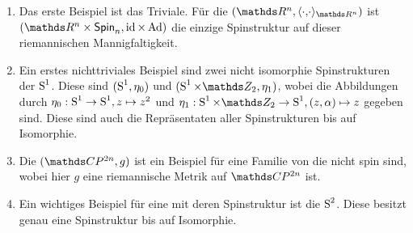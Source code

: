 \begin{Bsp}
	\begin{enumerate}[(1)]
		\item Das erste Beispiel ist das Triviale. Für die \RMF $(\R^n, \scdots_{\R^n})$ ist $(\R^n \times \spin{n},\id \times \Ad)$ 
		die einzige Spinstruktur auf dieser riemannischen 
		Mannigfaltigkeit.
		\item Ein erstes nichttriviales Beispiel sind zwei nicht
		isomorphie Spinstrukturen der $\S^1$. Diese sind $(\S^1 , \eta_0)$ und $(\S^1 \times \Z_2 , \eta_1)$, wobei die Abbildungen durch $\eta_0 : \S^1 \rightarrow \S^1 , z \mapsto z^2$ und $\eta_1 : \S^1 \times \Z_2 \rightarrow \S^1 , (z,\alpha) \mapsto z$ gegeben sind. Diese sind auch die Repräsentaten aller Spinstrukturen bis auf 
		Isomorphie. 
		\item Die $(\CP^{2n},g)$ ist ein Beispiel für eine Familie von
		\RMFen die nicht spin sind, wobei
		hier $g$ eine riemannische Metrik
		auf $\CP^{2n}$ ist. 
		\item Ein wichtiges Beispiel für eine \RMF mit deren Spinstruktur ist die $\S^2$. Diese
		besitzt genau eine Spinstruktur bis auf Isomorphie. 
	\end{enumerate}
\end{Bsp}






